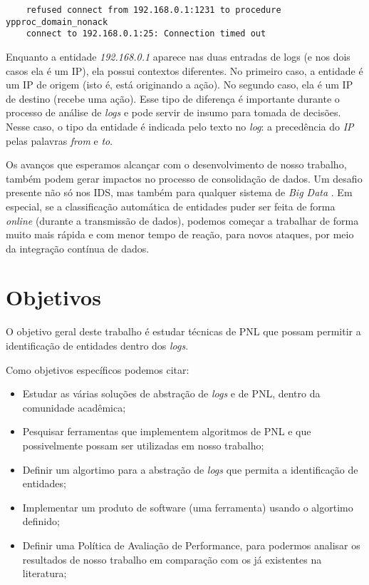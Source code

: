 \documentclass[
	12pt,				%
	openright,			%
	twoside,			%
	a4paper,			%
	english,			%
	spanish,			%
	brazil,				%
	]{abntex2}
\begin{document}
{\small
	\begin{verbatim}
	refused connect from 192.168.0.1:1231 to procedure ypproc_domain_nonack
	connect to 192.168.0.1:25: Connection timed out
	\end{verbatim}
}

Enquanto a entidade \emph{192.168.0.1} aparece nas duas entradas de logs (e nos dois casos ela é um IP), ela possui contextos diferentes. No primeiro caso, a entidade é um IP de origem (isto é, está originando a ação). No segundo caso, ela é um IP de destino (recebe uma ação). Esse tipo de diferença é importante durante o processo de análise de \emph{logs} e pode servir de insumo para tomada de decisões. Nesse caso, o tipo da entidade é indicada pelo texto no \emph{log}: a precedência do \emph{IP} pelas palavras \emph{from} e \emph{to}.

Os avanços que esperamos alcançar com o desenvolvimento de nosso trabalho, também podem gerar impactos no processo de consolidação de dados. Um desafio presente não só nos IDS, mas também para qualquer sistema de \emph{Big Data} \cite{zuech2015intrusion}. Em especial, se a classificação automática de entidades puder ser feita de forma \emph{online} (durante a transmissão de dados), podemos começar a trabalhar de forma muito mais rápida e com menor tempo de reação, para novos ataques, por meio da integração contínua de dados.


\section{Objetivos}
O objetivo geral deste trabalho é estudar técnicas de PNL que possam permitir a identificação de entidades dentro dos \emph{logs}.

Como objetivos específicos podemos citar:
\begin{itemize}
	\item Estudar as várias soluções de abstração de \emph{logs} e de PNL, dentro da comunidade acadêmica;

	\item Pesquisar ferramentas que implementem algoritmos de PNL e que possivelmente possam ser utilizadas em nosso trabalho;

	\item Definir um algortimo para a abstração de \emph{logs} que permita a identificação de entidades;

	\item Implementar um produto de software (uma ferramenta) usando o algortimo definido;

	\item Definir uma Política de Avaliação de Performance, para podermos analisar os resultados de nosso trabalho em comparação com os já existentes na literatura;

\end{itemize}
\end{document}

